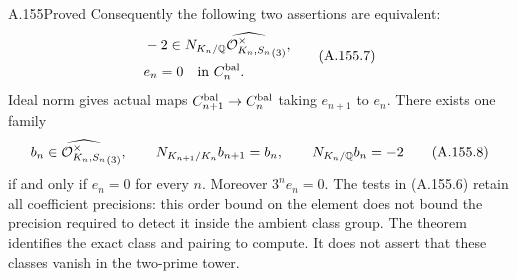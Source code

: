 \begin{statement}{A.155}{Proved}
Consequently the following two assertions are equivalent:
\[
 \begin{aligned}
 &-2\in N_{K_n/\mathbb Q}
           \widehat{\mathcal O_{K_n,S_n}^{\times}}_{(3)},\\
 &e_n=0\quad\text{in }C_n^{\rm bal}.
 \end{aligned}
\tag{A.155.7}
\]
Ideal norm gives actual maps
\(C_{n+1}^{\rm bal}\to C_n^{\rm bal}\) taking
\(e_{n+1}\) to \(e_n\).
There exists one family
\[
 b_n\in\widehat{\mathcal O_{K_n,S_n}^{\times}}_{(3)},\qquad
 N_{K_{n+1}/K_n}b_{n+1}=b_n,\qquad N_{K_n/\mathbb Q}b_n=-2
\tag{A.155.8}
\]
if and only if \(e_n=0\) for every \(n\).
Moreover \(3^n e_n=0\).
The tests in (A.155.6) retain all coefficient precisions: this order
bound on the element does not bound the precision required to detect
it inside the ambient class group.
The theorem identifies the exact class and pairing to compute.
It does not assert that these classes vanish in the two-prime tower.
\end{statement}

